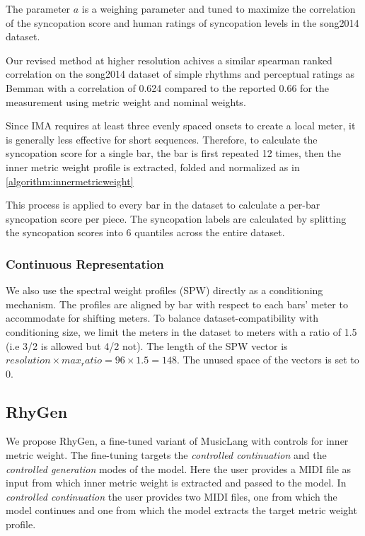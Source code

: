 The parameter $a$ is a weighing parameter and tuned to maximize the correlation of the syncopation score and human ratings of syncopation levels in the song2014 dataset.

Our revised method at higher resolution achives a similar spearman ranked correlation on the song2014 \cite{chunyang2015a} dataset of simple rhythms and perceptual ratings as Bemman with a correlation of 0.624 compared to the reported 0.66 for the measurement using metric weight and nominal weights. 

Since IMA requires at least three evenly spaced onsets to create a local meter, it is generally less effective for short sequences. Therefore, to calculate the syncopation score for a single bar, the bar is first repeated 12 times, then the inner metric weight profile is extracted, folded and normalized as in \ref{algorithm:innermetricweight} 

This process is applied to every bar in the dataset to calculate a per-bar syncopation score per piece. The syncopation labels are calculated by splitting the syncopation scores into 6 quantiles across the entire dataset. 

\subsubsection{Continuous Representation}
We also use the spectral weight profiles (SPW) directly as a conditioning mechanism. 
The profiles are aligned by bar with respect to each bars' meter to accommodate for shifting meters. To balance dataset-compatibility with conditioning size, we limit the meters in the dataset to meters with a ratio of 1.5 (i.e 3/2 is allowed but 4/2 not). The length of the SPW vector is $resolution \times max_ratio = 96 \times 1.5 = 148$. The unused space of the vectors is set to 0.  





\subsection{RhyGen}
We propose RhyGen, a fine-tuned variant of MusicLang with controls for inner metric weight. The fine-tuning targets the \textit{controlled continuation} and the \textit{controlled generation} modes of the model. Here the user provides a MIDI file as input from which inner metric weight is extracted and passed to the model. In \textit{controlled continuation} the user provides two MIDI files, one from which the model continues and one from which the model extracts the target metric weight profile. 

